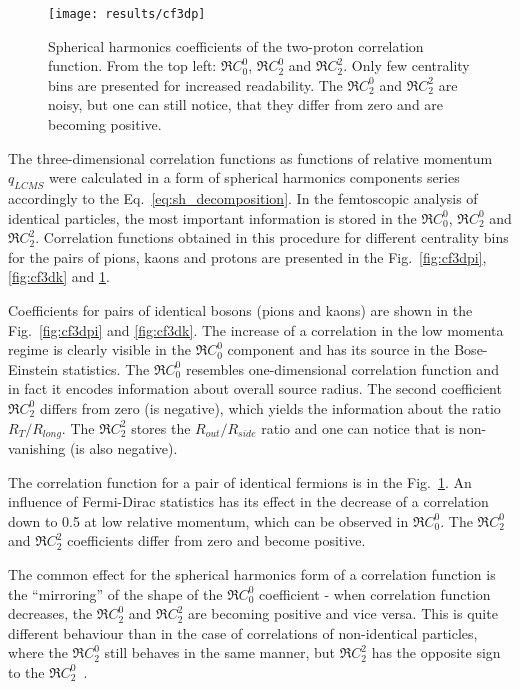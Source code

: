      \begin{figure}[h]
        \centering
        \centerline{\texttt{[image: results/cf3dp]}}
        \caption{Spherical harmonics coefficients of the two-proton correlation function. From the top left: $\Re C^0_0$, $\Re C^0_2$ and $\Re C^2_2$. Only few centrality bins are presented for increased readability. The $\Re C^0_2$ and $\Re C^2_2$ are noisy, but one can still notice, that they differ from zero and are becoming positive.}
      \label{fig:cf3dp}
      \end{figure}

      The three-dimensional correlation functions as functions of relative momentum $q_{LCMS}$ were calculated in a form of spherical harmonics components series accordingly to the Eq.~\ref{eq:sh_decomposition}.
      In the femtoscopic analysis of identical particles, the most important information is stored in the $\Re C^0_0$, $\Re C^0_2$ and $\Re C^2_2$.
      Correlation functions obtained in this procedure for different centrality bins for the pairs of pions, kaons and protons are presented in the Fig.~\ref{fig:cf3dpi}, \ref{fig:cf3dk} and \ref{fig:cf3dp}.
      
      Coefficients for pairs of identical bosons (pions and kaons) are shown in the Fig.~\ref{fig:cf3dpi} and \ref{fig:cf3dk}.
      The increase of a correlation in the low momenta regime is clearly visible in the $\Re C^0_0$ component and has its source in the Bose-Einstein statistics.
      The $\Re C_0^0$ resembles one-dimensional correlation function and in fact it encodes information about overall source radius.
      The second coefficient $\Re C^0_2$ differs from zero (is negative), which yields the information about the ratio $R_T / R_{long}$.
      The $\Re C^2_2$ stores the $R_{out} / R_{side}$ ratio and one can notice that is non-vanishing (is also negative).

      The correlation function for a pair of identical fermions is in the Fig.~\ref{fig:cf3dp}.
      An influence of Fermi-Dirac statistics has its effect in the decrease of a correlation down to 0.5 at low relative momentum, which can be observed in $\Re C^0_0$.
      The $\Re C^0_2$ and $\Re C^2_2$ coefficients differ from zero and become positive.

      The common effect for the spherical harmonics form of a correlation function is the ``mirroring'' of the shape of the $\Re C^0_0$ coefficient - when correlation function decreases, the $\Re C^0_2$ and $\Re C^2_2$ are becoming positive and vice versa.
      This is quite different behaviour than in the case of correlations of non-identical particles, where the $\Re C^0_2$ still behaves in the same manner, but $\Re C_2^2$ has the opposite sign to the $\Re C^0_2$~\cite{nonidfemto}.

